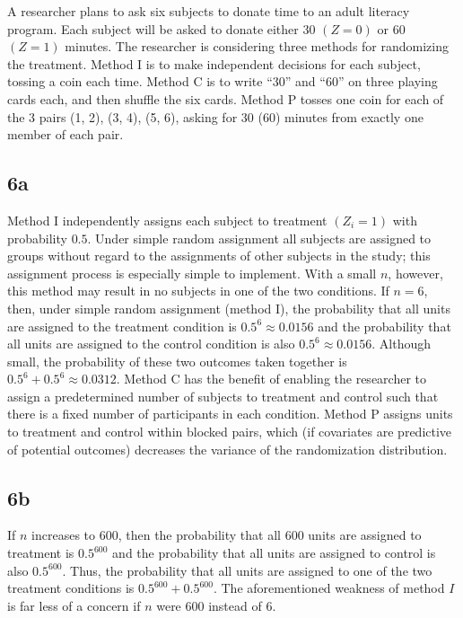 \documentclass[
  12pt,
  leqno]{article}
\DeclareMathOperator{\1}{\mathbbm{1}}
\begin{document}
A researcher plans to ask six subjects to donate time to an adult
literacy program. Each subject will be asked to donate either \(30\)
\((Z = 0)\) or \(60\) \((Z = 1)\) minutes. The researcher is considering
three methods for randomizing the treatment. Method I is to make
independent decisions for each subject, tossing a coin each time. Method
C is to write ``30'' and ``60'' on three playing cards each, and then
shuffle the six cards. Method P tosses one coin for each of the 3 pairs
(1, 2), (3, 4), (5, 6), asking for 30 (60) minutes from exactly one
member of each pair.

\subsection*{6a}

Method I independently assigns each subject to treatment \((Z_i = 1)\)
with probability \(0.5\). Under simple random assignment all subjects
are assigned to groups without regard to the assignments of other
subjects in the study; this assignment process is especially simple to
implement. With a small \(n\), however, this method may result in no
subjects in one of the two conditions. If \(n = 6\), then, under simple
random assignment (method I), the probability that all units are
assigned to the treatment condition is \(0.5^6 \approx 0.0156\) and the
probability that all units are assigned to the control condition is also
\(0.5^6 \approx 0.0156\). Although small, the probability of these two
outcomes taken together is \(0.5^6 + 0.5^6 \approx 0.0312\). Method C
has the benefit of enabling the researcher to assign a predetermined
number of subjects to treatment and control such that there is a fixed
number of participants in each condition. Method P assigns units to
treatment and control within blocked pairs, which (if covariates are
predictive of potential outcomes) decreases the variance of the
randomization distribution.

\subsection*{6b}

If \(n\) increases to \(600\), then the probability that all \(600\)
units are assigned to treatment is \(0.5^{600}\) and the probability
that all units are assigned to control is also \(0.5^{600}\). Thus, the
probability that all units are assigned to one of the two treatment
conditions is \(0.5^{600} + 0.5^{600}\). The aforementioned weakness of
method \(I\) is far less of a concern if \(n\) were \(600\) instead of
\(6\).
\end{document}
